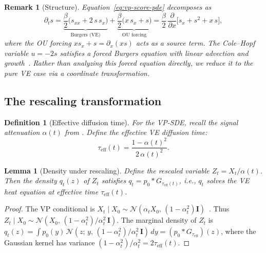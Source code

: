 \documentclass[11pt]{article}
\newtheorem{lemma}[theorem]{Lemma}
\newtheorem{definition}[theorem]{Definition}
\newtheorem{remark}[theorem]{Remark}
\begin{document}
\begin{remark}[Structure]\label{rem:vp-structure}
Equation~\eqref{eq:vp-score-pde} decomposes as
\begin{equation}\label{eq:vp-decomposition}
  \partial_t s
  = \underbrace{\frac{\beta}{2}\bigl(s_{xx} + 2\,s\,s_x\bigr)}_{\text{Burgers (VE)}}
  + \underbrace{\frac{\beta}{2}\bigl(x\,s_x + s\bigr)}_{\text{OU forcing}}
  = \frac{\beta}{2}\,\frac{\partial}{\partial x}\bigl[s_x + s^2 + x\,s\bigr],
\end{equation}
where the OU forcing $xs_x + s = \partial_x(xs)$ acts as a source term.
The Cole--Hopf variable $u = -2s$ satisfies a forced Burgers equation with linear advection and growth~\citep{whitham1974linear}.
Rather than analyzing this forced equation directly, we reduce it to the pure VE case via a coordinate transformation.
\end{remark}

\subsection{The rescaling transformation}\label{sec:vp:transform}

\begin{definition}[Effective diffusion time]\label{def:tau-eff}
For the VP-SDE, recall the signal attenuation $\alpha(t)$ from . Define the \emph{effective VE diffusion time}:
\begin{equation}\label{eq:tau-eff}
  \tau_{\mathrm{eff}}(t)
  = \frac{1 - \alpha(t)^2}{2\,\alpha(t)^2}.
\end{equation}
\end{definition}

\begin{lemma}[Density under rescaling]\label{lem:rescaling}
Define the rescaled variable $Z_t = X_t / \alpha(t)$.
Then the density $q_t(z)$ of $Z_t$ satisfies $q_t = p_0 * G_{\tau_{\mathrm{eff}}(t)}$, i.e., $q_t$ solves the VE heat equation at effective time $\tau_{\mathrm{eff}}(t)$.
\end{lemma}

\begin{proof}
The VP conditional is $X_t \mid X_0 \sim \mathcal{N}(\alpha_t X_0,\, (1-\alpha_t^2)\bm{I})$~\citep{song2021score}.
Thus $Z_t \mid X_0 \sim \mathcal{N}(X_0,\, (1-\alpha_t^2)/\alpha_t^2\,\bm{I})$.
The marginal density of $Z_t$ is
$q_t(z) = \int p_0(y)\,\mathcal{N}(z;\,y,\,(1-\alpha_t^2)/\alpha_t^2\,\bm{I})\,dy = (p_0 * G_{\tau_{\mathrm{eff}}})(z)$,
where the Gaussian kernel has variance $(1-\alpha_t^2)/\alpha_t^2 = 2\tau_{\mathrm{eff}}(t)$.
\end{proof}
\end{document}
